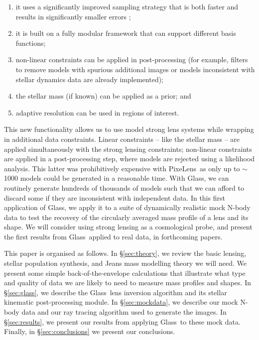 \documentclass[galley]{mn2e}
\newcommand{\Glass}{{\sc Glass}}
\newcommand{\PixeLens}{{\sc PixeLens}}
\begin{document}
\begin{enumerate} 
\item it uses a significantly improved sampling strategy that is both faster and results in significantly smaller errors \citep{2012MNRAS.425.3077L};
\item it is built on a fully modular framework that can support different basis functions;
\item non-linear constraints can be applied in post-processing (for example, filters to remove models with spurious additional images or models inconsistent with stellar dynamics data are already implemented);
\item the stellar mass (if known) can be applied as a prior; and
\item adaptive resolution can be used in regions of interest. 
\end{enumerate}

This new functionality allows us to use model strong lens systems while wrapping in additional data constraints. Linear constraints -- like the stellar mass -- are applied simultaneously with the strong lensing constraints; non-linear constraints are applied in a post-processing step, where models are rejected using a likelihood analysis. This latter was prohibitively expensive with \PixeLens\ as only up to $\sim$1000 models could be generated in a reasonable time. With \Glass, we can routinely generate hundreds of thousands of models such that we can afford to discard some if they are inconsistent with independent data. In this first application of \Glass, we apply it to a suite of dynamically realistic mock N-body data to test the recovery of the circularly averaged mass profile of a lens and its shape. We will consider using strong lensing as a cosmological probe, and present the first results from \Glass\ applied to real data, in forthcoming papers.

This paper is organised as follows. In \S\ref{sec:theory}, we review the basic lensing, stellar population synthesis, and Jeans mass modelling theory we will need. We present some simple back-of-the-envelope calculations that illustrate what type and quality of data we are likely to need to measure mass profiles and shapes. In \S\ref{sec:glass}, we describe the \Glass\ lens inversion algorithm and its stellar kinematic post-processing module. In \S\ref{sec:mockdata}, we describe our mock N-body data and our ray tracing algorithm used to generate the images. In \S\ref{sec:results}, we present our results from applying \Glass\ to these mock data. Finally, in \S\ref{sec:conclusions} we present our conclusions. 
\end{document}
